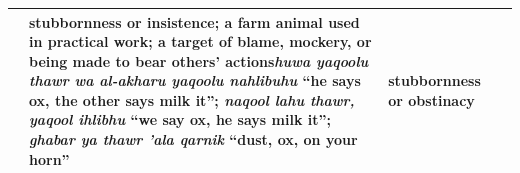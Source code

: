 \begin{table}[t]
\begin{tabular}{@{}p{}p{}p{}p{}@{}}
& \textcolor{zhcolor}{stubbornness or insistence; a farm animal used in practical work; a target of blame, mockery, or being made to bear others' actions}\newline \textit{huwa yaqoolu thawr wa al-akharu yaqoolu nahlibuhu} ``he says ox, the other says milk it''; \textit{naqool lahu thawr, yaqool ihlibhu} ``we say ox, he says milk it''; \textit{ghabar ya thawr 'ala qarnik} ``dust, ox, on your horn''
& stubbornness or obstinacy \\
\bottomrule
\end{tabular}
\end{table}

